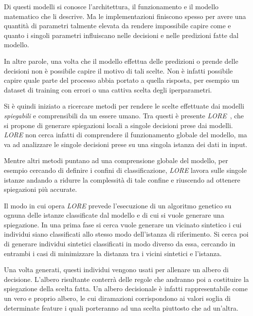 Di questi modelli si conosce l'architettura, il funzionamento e il modello
matematico che li descrive. Ma le implementazioni finiscono spesso per avere
una quantità di parametri talmente elevata da rendere impossibile capire come
e quanto i singoli parametri influiscano nelle decisioni e nelle predizioni
fatte dal modello.

In altre parole, una volta che il modello effettua delle predizioni o prende
delle decisioni non è possibile capire il motivo di tali scelte. Non è infatti
possibile capire quale parte del processo abbia portato a quella risposta, per
esempio un dataset di training con errori o una cattiva scelta degli
iperparametri.

Si è quindi iniziato a ricercare metodi per rendere le scelte effettuate dai
modelli \textit{spiegabili} e comprensibili da un essere umano. Tra questi
è presente \textit{LORE}~\cite{guidotti2018LORE}, che si propone di generare
spiegazioni locali a singole decisioni prese dai modelli. \textit{LORE} non
cerca infatti di comprendere il funzionamento globale del modello, ma va ad
analizzare le singole decisioni prese su una singola istanza dei dati in input.

Mentre altri metodi puntano ad una comprensione globale del modello, per
esempio cercando di definire i confini di classificazione, \textit{LORE} lavora
sulle singole istanze andando a ridurre la complessità di tale confine e
riuscendo ad ottenere spiegazioni più accurate.

Il modo in cui opera \textit{LORE} prevede l'esecuzione di un algoritmo
genetico su ognuna delle istanze classificate dal modello e di cui si vuole
generare una spiegazione. In una prima fase si cerca vuole generare un vicinato
sintetico i cui individui siano classificati allo stesso modo dell'istanza
di riferimento. Si cerca poi di generare individui sintetici classificati in
modo diverso da essa, cercando in entrambi i casi di minimizzare la distanza
tra i vicini sintetici e l'istanza.

Una volta generati, questi individui vengono usati per allenare un albero di
decisione. L'albero risultante conterrà delle regole che andranno poi a
costituire la spiegazione della scelta fatta. Un albero decisionale è infatti
rappresentabile come un vero e proprio albero, le cui diramazioni corrispondono
ai valori soglia di determinate feature i quali porteranno ad una scelta
piuttosto che ad un'altra.
